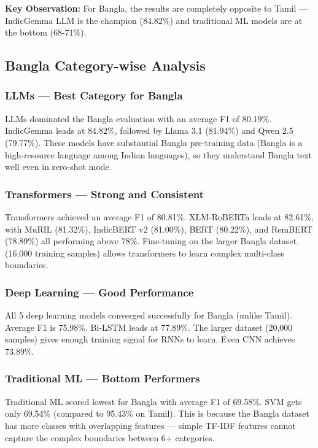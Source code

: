 \documentclass[conference]{IEEEtran}
\begin{document}
\textbf{Key Observation:} For Bangla, the results are completely opposite to Tamil --- IndicGemma LLM is the champion (84.82\%) and traditional ML models are at the bottom (68-71\%).

\subsection{Bangla Category-wise Analysis}

\subsubsection{LLMs --- Best Category for Bangla}
LLMs dominated the Bangla evaluation with an average F1 of 80.19\%. IndicGemma leads at 84.82\%, followed by Llama 3.1 (81.94\%) and Qwen 2.5 (79.77\%). These models have substantial Bangla pre-training data (Bangla is a high-resource language among Indian languages), so they understand Bangla text well even in zero-shot mode.

\subsubsection{Transformers --- Strong and Consistent}
Transformers achieved an average F1 of 80.81\%. XLM-RoBERTa leads at 82.61\%, with MuRIL (81.32\%), IndicBERT v2 (81.00\%), BERT (80.22\%), and RemBERT (78.89\%) all performing above 78\%. Fine-tuning on the larger Bangla dataset (16,000 training samples) allows transformers to learn complex multi-class boundaries.

\subsubsection{Deep Learning --- Good Performance}
All 5 deep learning models converged successfully for Bangla (unlike Tamil). Average F1 is 75.98\%. Bi-LSTM leads at 77.89\%. The larger dataset (20,000 samples) gives enough training signal for RNNs to learn. Even CNN achieves 73.89\%.

\subsubsection{Traditional ML --- Bottom Performers}
Traditional ML scored lowest for Bangla with average F1 of 69.58\%. SVM gets only 69.54\% (compared to 95.43\% on Tamil). This is because the Bangla dataset has more classes with overlapping features --- simple TF-IDF features cannot capture the complex boundaries between 6+ categories.
\end{document}

